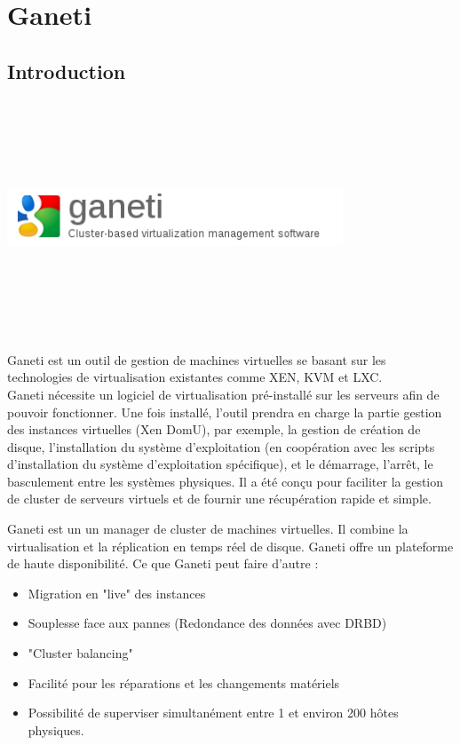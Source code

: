 \chapter{Ganeti}
\section{Introduction}

\includegraphics[width=10cm,height=7cm]{images/logo_ganeti.png}

Ganeti est un outil de gestion de machines virtuelles se basant sur les technologies de virtualisation existantes comme XEN, KVM et LXC.\\
Ganeti nécessite un logiciel de virtualisation pré-installé sur les serveurs afin de pouvoir fonctionner. Une fois installé, 
l'outil prendra en charge la partie gestion des instances virtuelles (Xen DomU), par exemple, la gestion de création de disque, 
l'installation du système d'exploitation (en coopération avec les scripts d'installation du système d'exploitation 
spécifique), et le démarrage, l'arrêt, le basculement entre les systèmes physiques. Il a été conçu pour faciliter la gestion de 
cluster de serveurs virtuels et de fournir une récupération rapide et simple.

Ganeti est un un manager de cluster de machines virtuelles. Il combine la virtualisation et la réplication en temps réel de disque.
Ganeti offre un plateforme de haute disponibilité.
Ce que Ganeti peut faire d'autre :
\begin{itemize}
\item Migration en "live" des instances
\item Souplesse face aux pannes (Redondance des données avec DRBD)
\item "Cluster balancing"
\item Facilité pour les réparations et les changements matériels
\item Possibilité de superviser simultanément entre 1 et environ 200 hôtes physiques.
\end{itemize}


